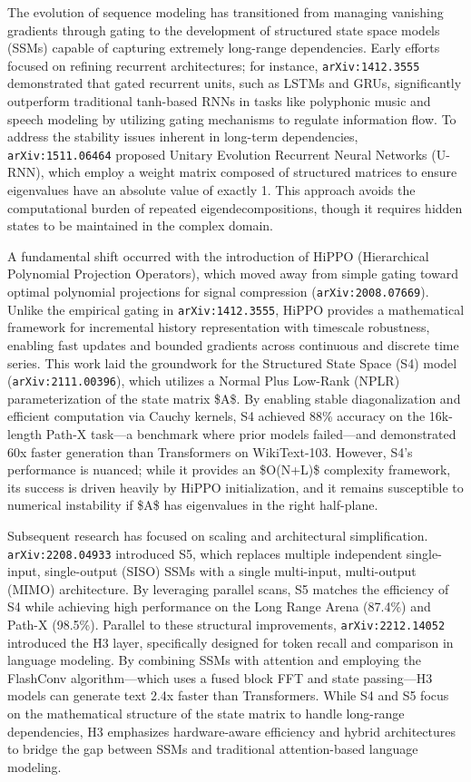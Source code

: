 \documentclass[11pt]{article}
\begin{document}
The evolution of sequence modeling has transitioned from managing vanishing gradients through gating to the development of structured state space models (SSMs) capable of capturing extremely long-range dependencies. Early efforts focused on refining recurrent architectures; for instance, \texttt{arXiv:1412.3555} demonstrated that gated recurrent units, such as LSTMs and GRUs, significantly outperform traditional tanh-based RNNs in tasks like polyphonic music and speech modeling by utilizing gating mechanisms to regulate information flow. To address the stability issues inherent in long-term dependencies, \texttt{arXiv:1511.06464} proposed Unitary Evolution Recurrent Neural Networks (U-RNN), which employ a weight matrix composed of structured matrices to ensure eigenvalues have an absolute value of exactly 1. This approach avoids the computational burden of repeated eigendecompositions, though it requires hidden states to be maintained in the complex domain.

A fundamental shift occurred with the introduction of HiPPO (Hierarchical Polynomial Projection Operators), which moved away from simple gating toward optimal polynomial projections for signal compression (\texttt{arXiv:2008.07669}). Unlike the empirical gating in \texttt{arXiv:1412.3555}, HiPPO provides a mathematical framework for incremental history representation with timescale robustness, enabling fast updates and bounded gradients across continuous and discrete time series. This work laid the groundwork for the Structured State Space (S4) model (\texttt{arXiv:2111.00396}), which utilizes a Normal Plus Low-Rank (NPLR) parameterization of the state matrix \$A\$. By enabling stable diagonalization and efficient computation via Cauchy kernels, S4 achieved 88\% accuracy on the 16k-length Path-X task—a benchmark where prior models failed—and demonstrated 60x faster generation than Transformers on WikiText-103. However, S4's performance is nuanced; while it provides an \$O(N+L)\$ complexity framework, its success is driven heavily by HiPPO initialization, and it remains susceptible to numerical instability if \$A\$ has eigenvalues in the right half-plane.

Subsequent research has focused on scaling and architectural simplification. \texttt{arXiv:2208.04933} introduced S5, which replaces multiple independent single-input, single-output (SISO) SSMs with a single multi-input, multi-output (MIMO) architecture. By leveraging parallel scans, S5 matches the efficiency of S4 while achieving high performance on the Long Range Arena (87.4\%) and Path-X (98.5\%). Parallel to these structural improvements, \texttt{arXiv:2212.14052} introduced the H3 layer, specifically designed for token recall and comparison in language modeling. By combining SSMs with attention and employing the FlashConv algorithm—which uses a fused block FFT and state passing—H3 models can generate text 2.4x faster than Transformers. While S4 and S5 focus on the mathematical structure of the state matrix to handle long-range dependencies, H3 emphasizes hardware-aware efficiency and hybrid architectures to bridge the gap between SSMs and traditional attention-based language modeling.
\end{document}
